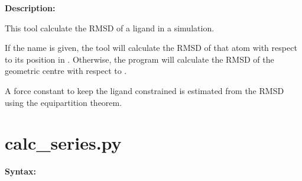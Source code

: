 \documentclass[letterpaper,10pt,english]{manual}
\begin{document}
\textbf{Description:}

This tool calculate the RMSD of a ligand in a simulation.

If the  name is given, the tool will calculate the RMSD of that atom with respect to its position in . Otherwise, the program will calculate the RMSD of the geometric centre with respect to .

A force constant to keep the ligand constrained is estimated from the RMSD using the equipartition theorem.


\section{calc\_series.py}

\textbf{Syntax:}
\end{document}
